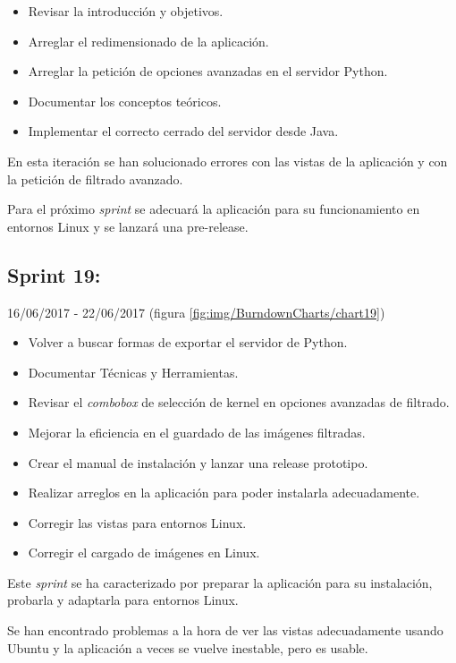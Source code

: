 \begin{itemize}
    \item Revisar la introducción y objetivos.
    \item Arreglar el redimensionado de la aplicación.
    \item Arreglar la petición de opciones avanzadas en el servidor Python.
    \item Documentar los conceptos teóricos.
    \item Implementar el correcto cerrado del servidor desde Java.
\end{itemize}

En esta iteración se han solucionado errores con las vistas de la aplicación y con la petición de filtrado avanzado.

Para el próximo \textit{sprint} se adecuará la aplicación para su funcionamiento en entornos Linux y se lanzará una pre-release.

\newpage

\subsection{Sprint 19:}
16/06/2017 - 22/06/2017 (figura \ref{fig:img/BurndownCharts/chart19})
\begin{itemize}
    \item Volver a buscar formas de exportar el servidor de Python.
    \item Documentar Técnicas y Herramientas.
    \item Revisar el \textit{combobox} de selección de kernel en opciones avanzadas de filtrado.
    \item Mejorar la eficiencia en el guardado de las imágenes filtradas.
    \item Crear el manual de instalación y lanzar una release prototipo.
    \item Realizar arreglos en la aplicación para poder instalarla adecuadamente.
    \item Corregir las vistas para entornos Linux.
    \item Corregir el cargado de imágenes en Linux.
\end{itemize}

Este \textit{sprint} se ha caracterizado por preparar la aplicación para su instalación, probarla y adaptarla para entornos Linux.

Se han encontrado problemas a la hora de ver las vistas adecuadamente usando Ubuntu y la aplicación a veces se vuelve inestable, pero es usable.

